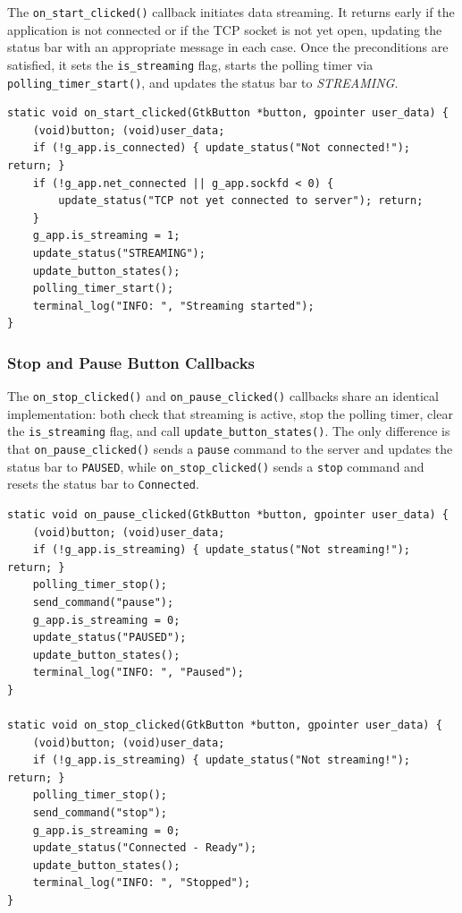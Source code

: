 The \texttt{on\_start\_clicked()} callback initiates data streaming. It
returns early if the application is not connected or if the TCP socket
is not yet open, updating the status bar with an appropriate message in
each case. Once the preconditions are satisfied, it sets the
\texttt{is\_streaming} flag, starts the polling timer via
\texttt{polling\_timer\_start()}, and updates the status bar to
\emph{STREAMING}.

\begin{verbatim}
static void on_start_clicked(GtkButton *button, gpointer user_data) {
    (void)button; (void)user_data;
    if (!g_app.is_connected) { update_status("Not connected!"); return; }
    if (!g_app.net_connected || g_app.sockfd < 0) {
        update_status("TCP not yet connected to server"); return;
    }
    g_app.is_streaming = 1;
    update_status("STREAMING");
    update_button_states();
    polling_timer_start();
    terminal_log("INFO: ", "Streaming started");
}
\end{verbatim}

\subsubsection{Stop and Pause Button Callbacks}

The \texttt{on\_stop\_clicked()} and \texttt{on\_pause\_clicked()}
callbacks share an identical implementation: both check that streaming
is active, stop the polling timer, clear the \texttt{is\_streaming}
flag, and call \texttt{update\_button\_states()}. The only difference is
that \texttt{on\_pause\_clicked()} sends a \texttt{pause} command to the
server and updates the status bar to \texttt{PAUSED}, while
\texttt{on\_stop\_clicked()} sends a \texttt{stop} command and resets
the status bar to \texttt{Connected}.

\begin{verbatim}
static void on_pause_clicked(GtkButton *button, gpointer user_data) {
    (void)button; (void)user_data;
    if (!g_app.is_streaming) { update_status("Not streaming!"); return; }
    polling_timer_stop();
    send_command("pause");
    g_app.is_streaming = 0;
    update_status("PAUSED");
    update_button_states();
    terminal_log("INFO: ", "Paused");
}

static void on_stop_clicked(GtkButton *button, gpointer user_data) {
    (void)button; (void)user_data;
    if (!g_app.is_streaming) { update_status("Not streaming!"); return; }
    polling_timer_stop();
    send_command("stop");
    g_app.is_streaming = 0;
    update_status("Connected - Ready");
    update_button_states();
    terminal_log("INFO: ", "Stopped");
}
\end{verbatim}

